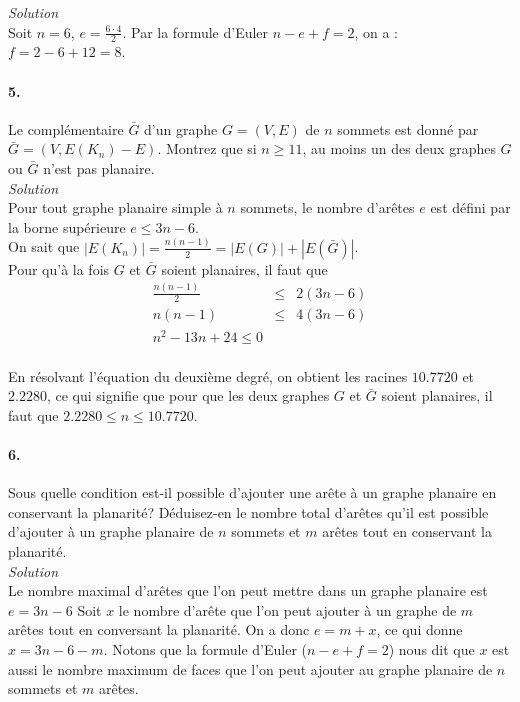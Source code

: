 \textit{Solution}\\

Soit $n = 6$, $e = \frac{6 \cdot 4}{2}$. Par la formule d'Euler $ n - e + f = 2$, on a : $f = 2 - 6 + 12 = 8$.

\paragraph{5. }Le complémentaire $\bar{G}$ d'un graphe $G = (V,E)$ de $n$ sommets est donné par $\bar{G} = (V, E(K_n)-E)$. Montrez que si $n \geq 11$, au moins un des deux graphes $G$ ou $\bar{G}$ n'est pas planaire. \\

\textit{Solution}\\

Pour tout graphe planaire simple à $n$ sommets, le nombre d'arêtes $e$ est défini par la borne supérieure  $e \leq 3n - 6$. \\
On sait que $|E(K_{n})| = \frac{n(n-1)}{2} = |E(G)| + |E(\bar{G})|$. \\
Pour qu'à la fois $G$ et $\bar{G}$ soient planaires, il faut que 
\[ \begin{array}{rcl}
 \frac{n(n-1)}{2} &\leq& 2 (3n - 6) \\
  n(n-1) &\leq& 4(3n - 6) \\
  n^2 - 13n + 24 \leq 0 \\
 \end{array} \]
 
 En résolvant l'équation du deuxième degré, on obtient les racines $10.7720$ et $2.2280$, ce qui signifie que pour que les deux graphes $G$ et $\bar{G}$ soient planaires, il faut que $2.2280 \leq n \leq 10.7720$.

\paragraph{6. }Sous quelle condition est-il possible d'ajouter une arête à un graphe planaire en conservant la planarité? Déduisez-en le nombre total d'arêtes qu'il est possible d'ajouter à un graphe planaire de $n$ sommets et $m$ arêtes tout en conservant la planarité.\\

\textit{Solution}\\

Le nombre maximal d'arêtes que l'on peut mettre dans un graphe planaire est $e = 3n - 6$ Soit $x$ le nombre d'arête que l'on peut ajouter à un graphe de $m$ arêtes tout en conversant la planarité. On a donc $e = m + x$, ce qui donne $x = 3n - 6 - m$. Notons que la formule d'Euler ($ n - e + f = 2$) nous dit que $x$ est aussi le nombre maximum de faces que l'on peut ajouter au graphe planaire de $n$ sommets et $m$ arêtes. 


